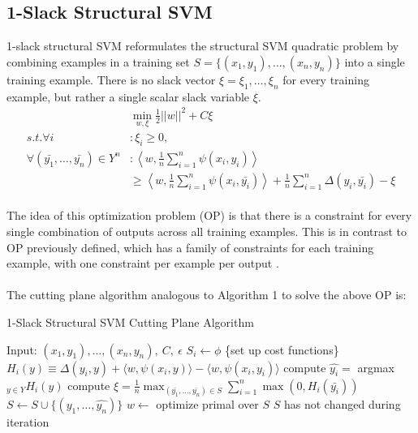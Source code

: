 \subsection{1-Slack Structural SVM}
1-slack structural SVM reformulates the structural SVM quadratic problem by combining examples in a training set $S = \{(x_1, y_1), \ldots , (x_n, y_n)\}$ into a single training example. There is no slack vector $\xi = \xi _1, \ldots , \xi_n$ for every training example, but rather a single scalar slack variable $\xi$.
\begin{align}
&\min _{w, \xi} \frac{1}{2} ||w||^2 + C\xi \\
s.t. \forall i &: \xi _i \geq 0, \\
\forall (\bar{y_1}, \ldots, \bar{y_n}) \in Y^n &: \left \langle w, \frac{1}{n} \sum _{i=1} ^{n} \psi(x_i, y_i) \right\rangle \\
& \geq \left \langle w, \frac{1}{n} \sum _{i=1} ^{n} \psi(x_i, \bar{y_i}) \right\rangle + \frac{1}{n} \sum _{i=1} ^{n} \Delta(y_i, \bar{y_i}) - \xi
\end{align}
\\
The idea of this optimization problem (OP) is that there is a constraint for every single combination of outputs across all training examples. This is in contrast to OP previously defined, which has a family of constraints for each training example, with one constraint per example per output \cite{Finley2009}.
\\\\
\newpage
The cutting plane algorithm analogous to Algorithm 1 to solve the above OP is:
\begin{algorithm}
\caption{1-Slack Structural SVM Cutting Plane Algorithm}
\begin{algorithmic}[1]
\State Input: $(x_1, y_1), \ldots, (x_n, y_n), \ C, \ \epsilon $
\State $ S_i \gets \phi$
	\State \{set up cost functions\}
	\State $H_i(y) \equiv \Delta(y_i, y) + \langle w, \psi (x_i, y) \rangle - \langle w, \psi (x_i, y_i) \rangle$
\EndFor
\Repeat
		\State compute $\hat{y_i} = $ argmax$_{y \in Y} H_i(y)$
	\EndFor
	\State compute $\xi = \frac{1}{n} \max _{(\bar{y_1}, \ldots, \bar{y_n}) \in S} \sum _{i=1} ^ {n} \max(0, H_i(\bar{y_i}))$
		\State $S \gets S \cup \{(\hat{y_1}, \ldots, \hat{y_n})\}$
		\State $w \gets $ optimize primal over $S$
	\EndIf
\Until $S$ has not changed during iteration

\end{algorithmic}
\end{algorithm}